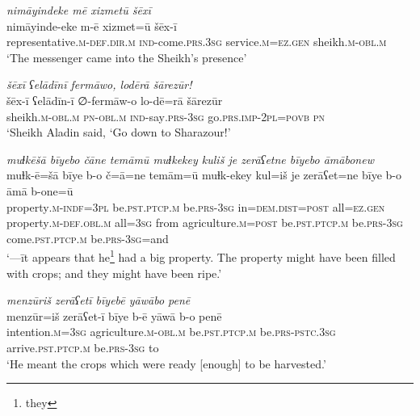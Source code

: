 \ea \label{PM.10}
\textit{nimāyindeke mē xizmetū šēxī} \\ 
\gll nimāyinde-eke m-ē xizmet=ū šēx-ī \\ 
 representative\textsc{.m}\textsc{-def}\textsc{.dir}\textsc{.m} \textsc{ind-}come\textsc{.prs}\textsc{.3sg} service\textsc{.m}\textsc{\textsc{=ez.gen}} sheikh\textsc{.m}\textsc{-obl}\textsc{.m} \\ 
\glt `The messenger came into the Sheikh’s presence'
\z 
 
\ea \label{PM.16}
\textit{šēxī ʕelādīnī fermāwo, lodērā šārezūr!} \\ 
\gll šēx-ī ʕelādīn-ī ∅-fermāw-o lo-dē=rā šārezūr \\ 
 sheikh\textsc{.m}\textsc{-obl}\textsc{.m} \textsc{pn}\textsc{-obl}\textsc{.m} \textsc{ind-}say\textsc{.prs}\textsc{-3sg} go\textsc{.prs}.\textsc{imp-}\textsc{2pl}\textsc{=\textsc{povb}} \textsc{pn} \\ 
\glt `Sheikh Aladin said, ‘Go down to Sharazour!'
\z 
 
\ea \label{PM.18}
\textit{muɫkēšā bīyebo čāne temāmū muɫkekey kuliš je zerāʕetne bīyebo āmābonew} \\ 
\gll muɫk-ē=šā bīye b-o č=ā=ne temām=ū muɫk-ekey kul=iš je zerāʕet=ne bīye b-o āmā b-one=ū \\ 
 property\textsc{.m}\textsc{-indf}\textsc{=3pl} be\textsc{.pst}\textsc{.ptcp}\textsc{.m} be\textsc{.prs}\textsc{-3sg} in=\textsc{dem.dist}\textsc{=\textsc{post}} all\textsc{\textsc{=ez.gen}} property\textsc{.m}\textsc{-def}\textsc{.obl}\textsc{.m} all\textsc{=3sg} from agriculture\textsc{.m}\textsc{=\textsc{post}} be\textsc{.pst}\textsc{.ptcp}\textsc{.m} be\textsc{.prs}\textsc{-3sg} come\textsc{.pst}\textsc{.ptcp}\textsc{.m} be\textsc{.prs}\textsc{-3sg}=and \\ 
\glt `—īt appears that he\footnote{they} had a big property. The property might have been filled with crops; and they might have been ripe.'
\z 
 
\ea \label{PM.19}
\textit{menzūriš zerāʕetī bīyebē yāwābo penē} \\ 
\gll menzūr=iš zerāʕet-ī bīye b-ē yāwā b-o penē \\ 
 intention\textsc{.m}\textsc{=3sg} agriculture\textsc{.m}\textsc{-obl}\textsc{.m} be\textsc{.pst}\textsc{.ptcp}\textsc{.m} be\textsc{.prs}\textsc{-pstc}\textsc{.3sg} arrive\textsc{.pst}\textsc{.ptcp}\textsc{.m} be\textsc{.prs}\textsc{-3sg} to \\ 
\glt `He meant the crops which were ready [enough] to be harvested.'
\z 
 

